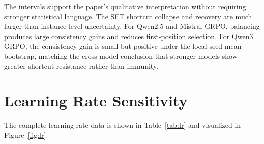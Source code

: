 \documentclass[letterpaper]{article}
\begin{document}
\begin{table}[htbp]
\centering
\scriptsize
\setlength{\tabcolsep}{3pt}
\caption{Bootstrap uncertainty checks. Diff is after $-$ before in percentage points. Single-run SFT rows use paired-instance bootstrap; multi-seed GRPO rows use seed-mean bootstrap.}
\label{tab:uncertainty}
\end{table}

The intervals support the paper's qualitative interpretation without requiring stronger statistical language. The SFT shortcut collapse and recovery are much larger than instance-level uncertainty. For Qwen2.5 and Mistral GRPO, balancing produces large consistency gains and reduces first-position selection. For Qwen3 GRPO, the consistency gain is small but positive under the local seed-mean bootstrap, matching the cross-model conclusion that stronger models show greater shortcut resistance rather than immunity.

\section{Learning Rate Sensitivity}
\label{app:lr}

The complete learning rate data is shown in Table~\ref{tab:lr} and visualized in Figure~\ref{fig:lr}.
\end{document}
